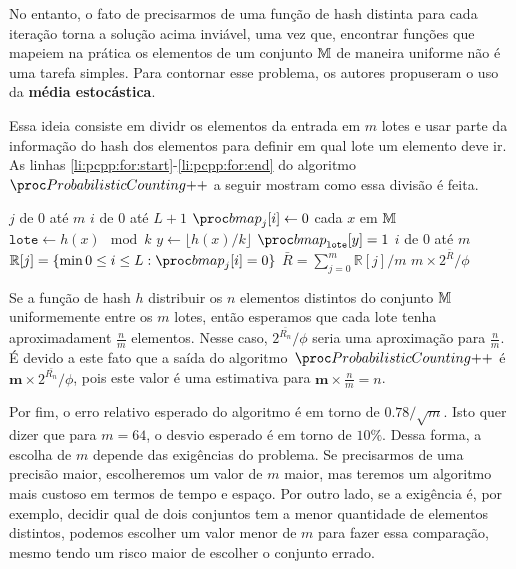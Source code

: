 No entanto, o fato de precisarmos de uma função de hash distinta para cada iteração torna a solução acima inviável, uma 
vez que, encontrar funções que mapeiem na prática os elementos de um conjunto $\mathbb{M}$ de maneira uniforme não é uma 
tarefa simples. Para contornar esse problema, os autores propuseram o uso da \textbf{média estocástica}.

Essa ideia consiste em dividr os elementos da entrada em $m$ lotes e usar parte da informação do hash dos elementos para 
definir em qual lote um elemento deve ir. As linhas \ref{li:pcpp:for:start}-\ref{li:pcpp:for:end} do algoritmo~$\pc{++}$ 
a seguir mostram como essa divisão é feita.

\begin{codebox}
  \li \For $j$ de $0$ até $m$
      \Do
  \li    \For $i$ de $0$ até $L + 1$
          \Do
  \li       $\bitmap_{j}[i] \gets 0$
          \End
      \End
  \li \For cada $x$ em $\mathbb{M}$                                                         \label{li:pcpp:for:start}
      \Do
  \li   $\texttt{lote} \gets h(x) \mod k$
  \li   $y \gets \lfloor h(x) / k \rfloor$
  \li   $\bitmap_{\texttt{lote}}[y] = 1$                                              \label{li:pcpp:for:end}
      \End
  \li \For $i$ de $0$ até $m$
      \Do
  \li    $\mathbb{R}[j] = \{ \min 0 \leq i \leq L: \bitmap_{j}[i] = 0 \}$             \label{li:pcpp:rmin}
      \End
  \li $\bar{R} = \sum_{j=0}^{m} \mathbb{R}[j] / m$
  \li \Return $m \times 2^{\bar{R}}/\phi$
  \End
\end{codebox}

Se a função de hash $h$ distribuir os $n$ elementos distintos do conjunto $\mathbb{M}$ uniformemente entre os $m$ lotes, então 
esperamos que cada lote tenha aproximadament $\frac{n}{m}$ elementos. Nesse caso, $2^{\bar{R_n}}/\phi$ seria uma 
aproximação para $\frac{n}{m}$. É devido a este fato que a saída do algoritmo~$\pc{++}$ é 
$\mathbf{m} \times 2^{\bar{R_n}}/\phi$, pois este valor é uma estimativa para $\mathbf{m} \times \frac{n}{m} = n$.

Por fim, o erro relativo esperado do algoritmo \pcpp é em torno de $0.78 / \sqrt{m}$. Isto quer 
dizer que para $m = 64$, o desvio esperado é em torno de $10\%$. Dessa forma, a escolha de $m$ depende das exigências do 
problema. Se precisarmos de uma precisão maior, escolheremos um valor de $m$  maior, mas teremos um algoritmo mais 
custoso em termos de tempo e espaço. Por outro lado, se a exigência é, por exemplo, decidir qual de dois conjuntos tem a 
menor quantidade de elementos distintos, podemos escolher um valor menor de $m$ para fazer essa comparação, mesmo tendo 
um risco maior de escolher o conjunto errado.

